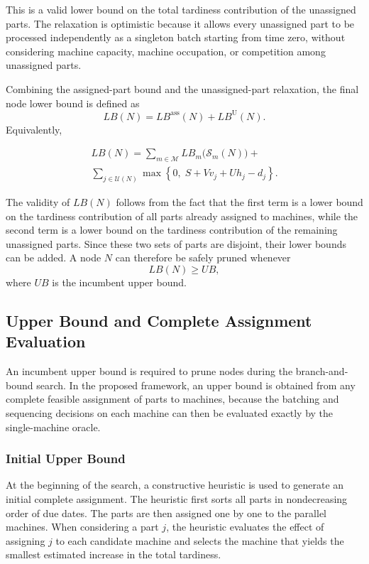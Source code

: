 \documentclass[letterpaper, 10 pt, conference]{ieeeconf}  %
\begin{document}
This is a valid lower bound on the total tardiness contribution of the
unassigned parts. The relaxation is optimistic because it allows every
unassigned part to be processed independently as a singleton batch starting
from time zero, without considering machine capacity, machine occupation, or
competition among unassigned parts.

Combining the assigned-part bound and the unassigned-part relaxation, the
final node lower bound is defined as
\[
LB(N)
=
LB^{\mathrm{ass}}(N)
+
LB^{\mathrm{U}}(N).
\]
Equivalently,

\begin{align}
LB(N)
=
\sum_{m\in\mathcal{M}}
LB_m\bigl(\mathcal{S}_m(N)\bigr)
+ \\
\sum_{j\in\mathcal{U}(N)}
\max\left\{0,\;S+Vv_j+Uh_j-d_j\right\}.
\end{align}

The validity of $LB(N)$ follows from the fact that the first term is a lower
bound on the tardiness contribution of all parts already assigned to
machines, while the second term is a lower bound on the tardiness
contribution of the remaining unassigned parts. Since these two sets of
parts are disjoint, their lower bounds can be added. A node $N$ can
therefore be safely pruned whenever
\[
LB(N)\ge UB,
\]
where $UB$ is the incumbent upper bound.


\subsection{Upper Bound and Complete Assignment Evaluation}
\label{subsec:ub_complete_eval}

An incumbent upper bound is required to prune nodes during the
branch-and-bound search. In the proposed framework, an upper bound is
obtained from any complete feasible assignment of parts to machines, because
the batching and sequencing decisions on each machine can then be evaluated
exactly by the single-machine oracle.

\subsubsection{Initial Upper Bound}

At the beginning of the search, a constructive heuristic is used to generate
an initial complete assignment. The heuristic first sorts all parts in
nondecreasing order of due dates. The parts are then assigned one by one to
the parallel machines. When considering a part $j$, the heuristic evaluates
the effect of assigning $j$ to each candidate machine and selects the
machine that yields the smallest estimated increase in the total tardiness.
\end{document}
